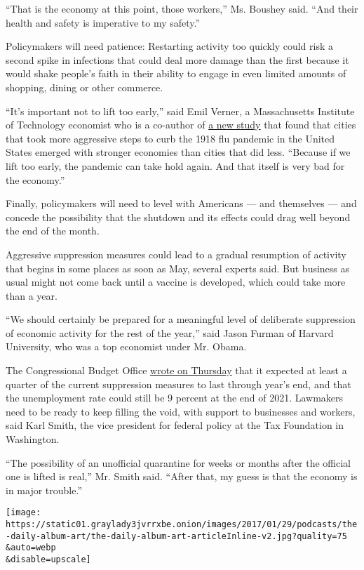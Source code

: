 ``That is the economy at this point, those workers,'' Ms. Boushey said.
``And their health and safety is imperative to my safety.''

Policymakers will need patience: Restarting activity too quickly could
risk a second spike in infections that could deal more damage than the
first because it would shake people's faith in their ability to engage
in even limited amounts of shopping, dining or other commerce.

``It's important not to lift too early,'' said Emil Verner, a
Massachusetts Institute of Technology economist who is a co-author of
\href{https://papers.ssrn.com/sol3/papers.cfm?abstract_id=3561560}{a new
study} that found that cities that took more aggressive steps to curb
the 1918 flu pandemic in the United States emerged with stronger
economies than cities that did less. ``Because if we lift too early, the
pandemic can take hold again. And that itself is very bad for the
economy.''

Finally, policymakers will need to level with Americans --- and
themselves --- and concede the possibility that the shutdown and its
effects could drag well beyond the end of the month.

Aggressive suppression measures could lead to a gradual resumption of
activity that begins in some places as soon as May, several experts
said. But business as usual might not come back until a vaccine is
developed, which could take more than a year.

``We should certainly be prepared for a meaningful level of deliberate
suppression of economic activity for the rest of the year,'' said Jason
Furman of Harvard University, who was a top economist under Mr. Obama.

The Congressional Budget Office
\href{https://www.cbo.gov/publication/56314}{wrote on Thursday} that it
expected at least a quarter of the current suppression measures to last
through year's end, and that the unemployment rate could still be 9
percent at the end of 2021. Lawmakers need to be ready to keep filling
the void, with support to businesses and workers, said Karl Smith, the
vice president for federal policy at the Tax Foundation in Washington.

``The possibility of an unofficial quarantine for weeks or months after
the official one is lifted is real,'' Mr. Smith said. ``After that, my
guess is that the economy is in major trouble.''

\texttt{[image: https://static01.graylady3jvrrxbe.onion/images/2017/01/29/podcasts/the-daily-album-art/the-daily-album-art-articleInline-v2.jpg?quality=75\\\&auto=webp\\\&disable=upscale]}

